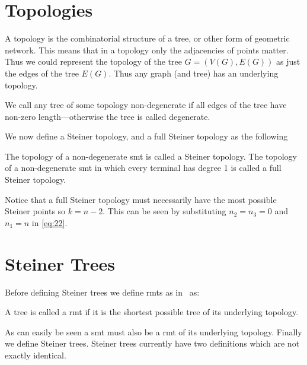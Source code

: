 \section{Topologies}
\label{sec:topologies-1}

A topology is the combinatorial structure of a tree, or other form of geometric
network. This means that in a topology only the adjacencies of points
matter. Thus we could represent the topology of the tree $G = (V(G), E(G))$ as
just the edges of the tree $E(G)$. Thus any graph (and tree) has an
underlying topology.

We call any tree of some topology non-degenerate if all edges of the tree have
non-zero length---otherwise the tree is called degenerate.

We now define a Steiner topology, and a full Steiner topology as the following
%
\begin{definition}
The topology of a non-degenerate \ac{smt} is called a Steiner topology. The
topology of a non-degenerate \ac{smt} in which every terminal has degree 1 is
called a full Steiner topology.
\end{definition}
%
Notice that a full Steiner topology must necessarily have the most possible
Steiner points so $ k = n - 2$. This can be seen by substituting $n_2 = n_3 = 0$
and $n_1 = n$ in \cref{eq:22}.

\section{Steiner Trees}
\label{sec:steiner-trees}

Before defining Steiner trees we define \acp{rmt} as in~\cite{gilbert1968}
as:
%
\begin{definition}
  A tree is called a \acl{rmt} if it is the shortest possible tree of its
  underlying topology.
\end{definition}
%
As can easily be seen a \ac{smt} must also be a \ac{rmt} of its underlying
topology. Finally we define Steiner trees. Steiner trees currently have two
definitions which are not exactly identical.

